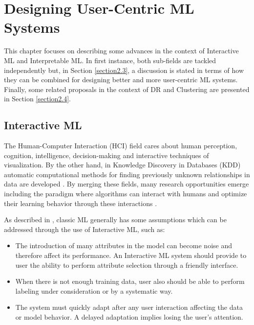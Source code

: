 
\chapter{Designing User-Centric ML Systems}
\label{chapter2}

\graphicspath{{Chapter2/figs/}}

This chapter focuses on describing some advances in the context of Interactive ML and Interpretable ML. In first instance, both sub-fields are tackled independently but, in Section \ref{section2.3}, a discussion is stated in terms of how they can be combined for designing better and more user-centric ML systems. Finally, some related proposals in the context of DR and Clustering are presented in Section \ref{section2.4}.

\section{Interactive ML}
\label{section2.1}

The Human-Computer Interaction (HCI) field cares about human perception, cognition, intelligence, decision-making and interactive techniques of visualization. By the other hand, in Knowledge Discovery in Databases (KDD) automatic computational methods for finding previously unknown relationships in data are developed \cite{Holzinger2013}. By merging these fields, many research opportunities emerge including the paradigm where algorithms can interact with humans and optimize their learning behavior through these interactions \cite{Holzinger2016}. 

As described in \cite{Fails2003}, classic ML generally has some assumptions which can be addressed through the use of Interactive ML, such as:

\begin{itemize}
\item The introduction of many attributes in the model can become noise and therefore affect its performance. An Interactive ML system should provide to user the ability to perform attribute selection through a friendly interface.
\item When there is not enough training data, user also should be able to perform labeling under consideration or by a systematic way.
\item The system must quickly adapt after any user interaction affecting the data or model behavior. A delayed adaptation implies losing the user's attention.
\end{itemize}

